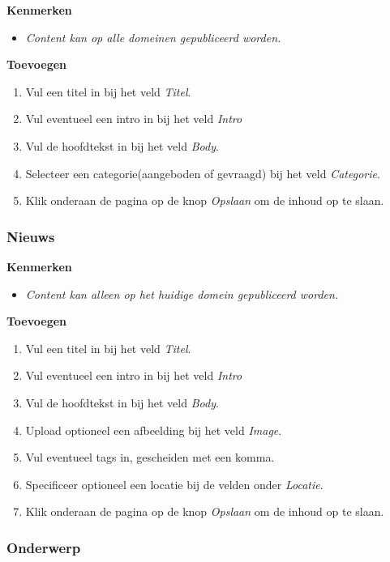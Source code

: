 \textbf{Kenmerken}

\begin{itemize}
\item \emph{Content kan op alle domeinen gepubliceerd worden.}
\end{itemize}

\textbf{Toevoegen}

\begin{enumerate}
\item Vul een titel in bij het veld \emph{Titel}.
\item Vul eventueel een intro in bij het veld \emph{Intro}
\item Vul de hoofdtekst in bij het veld \emph{Body}.
\item Selecteer een categorie(aangeboden of gevraagd) bij het veld \emph{Categorie}.
\item Klik onderaan de pagina op de knop \emph{Opslaan} om de inhoud op te slaan.
\end{enumerate}

\subsubsection{Nieuws}\label{nieuws}

\textbf{Kenmerken}

\begin{itemize}
\item \emph{Content kan alleen op het huidige domein gepubliceerd worden.}
\end{itemize}

\textbf{Toevoegen}

\begin{enumerate}
\item Vul een titel in bij het veld \emph{Titel}.
\item Vul eventueel een intro in bij het veld \emph{Intro}
\item Vul de hoofdtekst in bij het veld \emph{Body}.
\item Upload optioneel een afbeelding bij het veld \emph{Image}.
\item Vul eventueel tags in, gescheiden met een komma.
\item Specificeer optioneel een locatie bij de velden onder \emph{Locatie}.
\item Klik onderaan de pagina op de knop \emph{Opslaan} om de inhoud op te slaan.
\end{enumerate}

\subsubsection{Onderwerp}\label{onderwerp}

